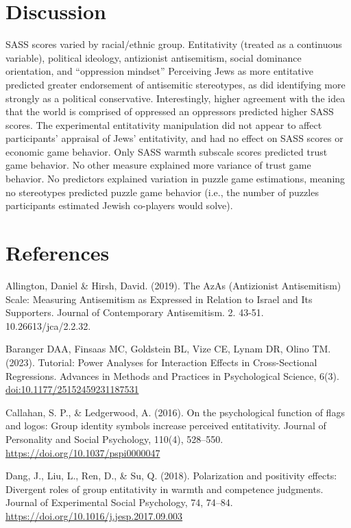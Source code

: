 \documentclass[
  doc,draftall]{apa6}
\begin{document}
\section{Discussion}\label{discussion}

SASS scores varied by racial/ethnic group. Entitativity (treated as a continuous variable), political ideology, antizionist antisemitism, social dominance orientation, and ``oppression mindset'' Perceiving Jews as more entitative predicted greater endorsement of antisemitic stereotypes, as did identifying more strongly as a political conservative. Interestingly, higher agreement with the idea that the world is comprised of oppressed an oppressors predicted higher SASS scores. The experimental entitativity manipulation did not appear to affect participants' appraisal of Jews' entitativity, and had no effect on SASS scores or economic game behavior.
Only SASS warmth subscale scores predicted trust game behavior. No other measure explained more variance of trust game behavior. No predictors explained variation in puzzle game estimations, meaning no stereotypes predicted puzzle game behavior (i.e., the number of puzzles participants estimated Jewish co-players would solve).

\newpage

\section{References}\label{references}

Allington, Daniel \& Hirsh, David. (2019). The AzAs (Antizionist Antisemitism) Scale: Measuring Antisemitism as Expressed in Relation to Israel and Its Supporters. Journal of Contemporary Antisemitism. 2. 43-51. 10.26613/jca/2.2.32.

Baranger DAA, Finsaas MC, Goldstein BL, Vize CE, Lynam DR, Olino TM. (2023). Tutorial: Power Analyses for Interaction Effects in Cross-Sectional Regressions. Advances in Methods and Practices in Psychological Science, 6(3). \url{doi:10.1177/25152459231187531}

Callahan, S. P., \& Ledgerwood, A. (2016). On the psychological function of flags and logos: Group identity symbols increase perceived entitativity. Journal of Personality and Social Psychology, 110(4), 528--550. \url{https://doi.org/10.1037/pspi0000047}

Dang, J., Liu, L., Ren, D., \& Su, Q. (2018). Polarization and positivity effects: Divergent roles of group entitativity in warmth and competence judgments. Journal of Experimental Social Psychology, 74, 74--84. \url{https://doi.org/10.1016/j.jesp.2017.09.003}
\end{document}
